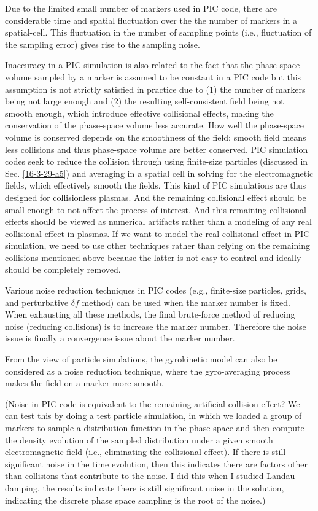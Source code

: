 \documentclass{article}
\begin{document}
Due to the limited small number of markers used in PIC code, there are
considerable time and spatial fluctuation over the the number of markers in a
spatial-cell. This fluctuation in the number of sampling points (i.e.,
fluctuation of the sampling error) gives rise to the sampling noise.

Inaccuracy in a PIC simulation is also related to the fact that the
phase-space volume sampled by a marker is assumed to be constant in a PIC code
but this assumption is not strictly satisfied in practice due to (1) the
number of markers being not large enough and (2) the resulting self-consistent
field being not smooth enough, which introduce effective collisional effects,
making the conservation of the phase-space volume less accurate. How well the
phase-space volume is conserved depends on the smoothness of the field: smooth
field means less collisions and thus phase-space volume are better conserved.
PIC simulation codes seek to reduce the collision through using finite-size
particles (discussed in Sec. \ref{16-3-29-a5}) and averaging in a spatial cell
in solving for the electromagnetic fields, which effectively smooth the
fields. This kind of PIC simulations are thus designed for collisionless
plasmas. And the remaining collisional effect should be small enough to not
affect the process of interest. And this remaining collisional effects should
be viewed as numerical artifacts rather than a modeling of any real
collisional effect in plasmas. If we want to model the real collisional effect
in PIC simulation, we need to use other techniques rather than relying on the
remaining collisions mentioned above because the latter is not easy to control
and ideally should be completely removed.

Various noise reduction techniques in PIC codes (e.g., finite-size particles,
grids, and perturbative $\delta f$ method) can be used when the marker number
is fixed. When exhausting all these methods, the final brute-force method of
reducing noise (reducing collisions) is to increase the marker number.
Therefore the noise issue is finally a convergence issue about the marker
number.

From the view of particle simulations, the gyrokinetic model can also be
considered as a noise reduction technique, where the gyro-averaging process
makes the field on a marker more smooth.

(Noise in PIC code is equivalent to the remaining artificial collision effect?
We can test this by doing a test particle simulation, in which we loaded a
group of markers to sample a distribution function in the phase space and then
compute the density evolution of the sampled distribution under a given smooth
electromagnetic field (i.e., eliminating the collisional effect). If there is
still significant noise in the time evolution, then this indicates there are
factors other than collisions that contribute to the noise. I did this when I
studied Landau damping, the results indicate there is still significant noise
in the solution, indicating the discrete phase space sampling is the root of
the noise.)
\end{document}
